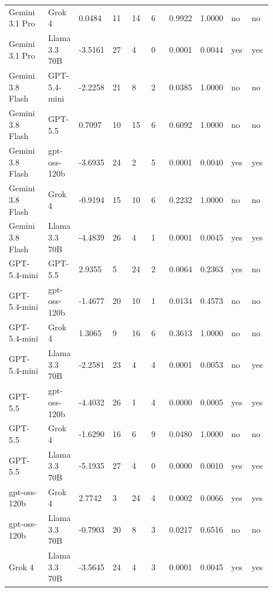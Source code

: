 \begin{landscape}
\begin{longtable}{p{0.162\linewidth}p{0.081\linewidth}p{0.081\linewidth}p{0.081\linewidth}p{0.081\linewidth}p{0.081\linewidth}p{0.081\linewidth}p{0.081\linewidth}p{0.081\linewidth}p{0.081\linewidth}}
Gemini 3.1 Pro & Grok 4 & 0.0484 & 11 & 14 & 6 & 0.9922 & 1.0000 & no & no \\
Gemini 3.1 Pro & Llama 3.3 70B & -3.5161 & 27 & 4 & 0 & 0.0001 & 0.0044 & yes & yes \\
Gemini 3.8 Flash & GPT-5.4-mini & -2.2258 & 21 & 8 & 2 & 0.0385 & 1.0000 & no & no \\
Gemini 3.8 Flash & GPT-5.5 & 0.7097 & 10 & 15 & 6 & 0.6092 & 1.0000 & no & no \\
Gemini 3.8 Flash & gpt-oss-120b & -3.6935 & 24 & 2 & 5 & 0.0001 & 0.0040 & yes & yes \\
Gemini 3.8 Flash & Grok 4 & -0.9194 & 15 & 10 & 6 & 0.2232 & 1.0000 & no & no \\
Gemini 3.8 Flash & Llama 3.3 70B & -4.4839 & 26 & 4 & 1 & 0.0001 & 0.0045 & yes & yes \\
GPT-5.4-mini & GPT-5.5 & 2.9355 & 5 & 24 & 2 & 0.0064 & 0.2363 & yes & no \\
GPT-5.4-mini & gpt-oss-120b & -1.4677 & 20 & 10 & 1 & 0.0134 & 0.4573 & no & no \\
GPT-5.4-mini & Grok 4 & 1.3065 & 9 & 16 & 6 & 0.3613 & 1.0000 & no & no \\
GPT-5.4-mini & Llama 3.3 70B & -2.2581 & 23 & 4 & 4 & 0.0001 & 0.0053 & no & yes \\
GPT-5.5 & gpt-oss-120b & -4.4032 & 26 & 1 & 4 & 0.0000 & 0.0005 & yes & yes \\
GPT-5.5 & Grok 4 & -1.6290 & 16 & 6 & 9 & 0.0480 & 1.0000 & no & no \\
GPT-5.5 & Llama 3.3 70B & -5.1935 & 27 & 4 & 0 & 0.0000 & 0.0010 & yes & yes \\
gpt-oss-120b & Grok 4 & 2.7742 & 3 & 24 & 4 & 0.0002 & 0.0066 & yes & yes \\
gpt-oss-120b & Llama 3.3 70B & -0.7903 & 20 & 8 & 3 & 0.0217 & 0.6516 & no & no \\
Grok 4 & Llama 3.3 70B & -3.5645 & 24 & 4 & 3 & 0.0001 & 0.0045 & yes & yes \\
\bottomrule
\end{longtable}
\normalsize
\end{landscape}

